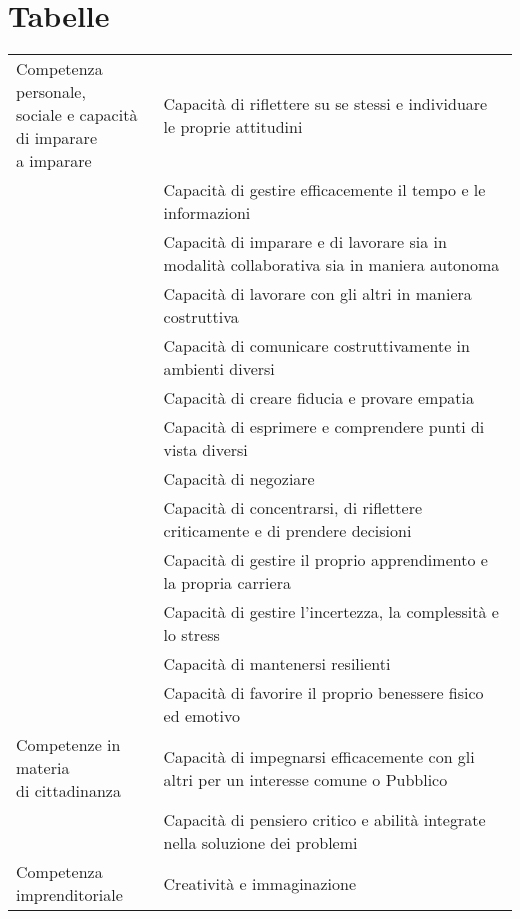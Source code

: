\chapter{Tabelle}
\begin{adjustbox}{max width=\textwidth}
\begin{tabular}{m{4cm}p{12.0cm}}
\toprule
\multirowcell{14}{Competenza personale,\\sociale e capacità\\ di imparare\\ a imparare}& Capacità di riflettere su se stessi e individuare le proprie attitudini\\
	&Capacità di gestire efficacemente il tempo e le informazioni  \\
	& Capacità di imparare e di lavorare sia in modalità collaborativa sia in maniera
	autonoma\\
	&  Capacità di lavorare con gli altri in maniera costruttiva\\
	&  Capacità di comunicare costruttivamente in ambienti diversi\\
	&  Capacità di creare fiducia e provare empatia\\
	&  Capacità di esprimere e comprendere punti di vista diversi\\
	&  Capacità di negoziare\\
	&  Capacità di concentrarsi, di riflettere criticamente e di prendere decisioni\\
	&  Capacità di gestire il proprio apprendimento e la propria carriera\\
	&  Capacità di gestire l'incertezza, la complessità e lo stress\\
	&  Capacità di mantenersi resilienti\\
	&  Capacità di favorire il proprio benessere fisico ed emotivo\\
\midrule
\multirowcell{1}{Competenze in materia\\di cittadinanza
}	& Capacità di impegnarsi efficacemente con gli altri per un interesse comune o
Pubblico \\
	& Capacità di pensiero critico e abilità integrate nella soluzione dei problemi \\
\midrule
	\multirowcell{12}{Competenza\\imprenditoriale}& Creatività e immaginazione\\

\end{tabular}
\end{adjustbox}
